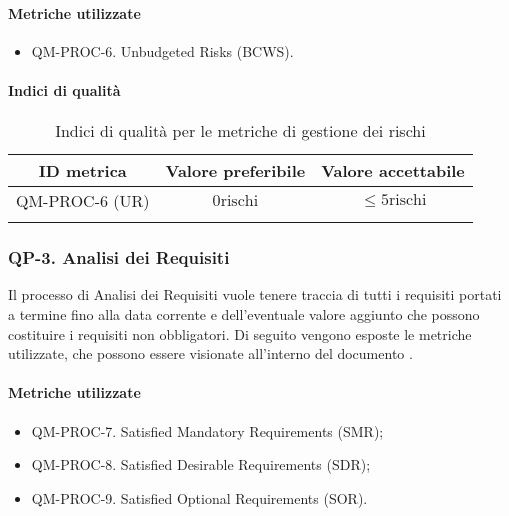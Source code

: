 		\paragraph{Metriche utilizzate}

			\begin{itemize}
				\item QM-PROC-6. Unbudgeted Risks (BCWS).
			\end{itemize}

		\paragraph{Indici di qualità}

			\begin{center}
				\begin{longtable}{|c|c|c|}
				\hline
				\rowcolor{lighter-grayer}
				\textbf{ID metrica} & \textbf{Valore preferibile} & \textbf{Valore accettabile}\\
				\hline
				\endfirsthead
				\hline
				QM-PROC-6 (UR) & \(0 \text{rischi}\) & \(\le 5 \text{rischi}\) \\
				\hline
				\caption{Indici di qualità per le metriche di gestione dei rischi}
				\end{longtable}
			\end{center}

	\subsubsection{QP-3. Analisi dei Requisiti}

		Il processo di Analisi dei Requisiti vuole tenere traccia di tutti i requisiti portati a termine fino alla data corrente e dell'eventuale valore aggiunto che possono costituire i requisiti non obbligatori.
		Di seguito vengono esposte le metriche utilizzate, che possono essere visionate all'interno del documento .

		\paragraph{Metriche utilizzate}

			\begin{itemize}
				\item QM-PROC-7. Satisfied Mandatory Requirements (SMR);
				\item QM-PROC-8. Satisfied Desirable Requirements (SDR);
				\item QM-PROC-9. Satisfied Optional Requirements (SOR).
			\end{itemize}


